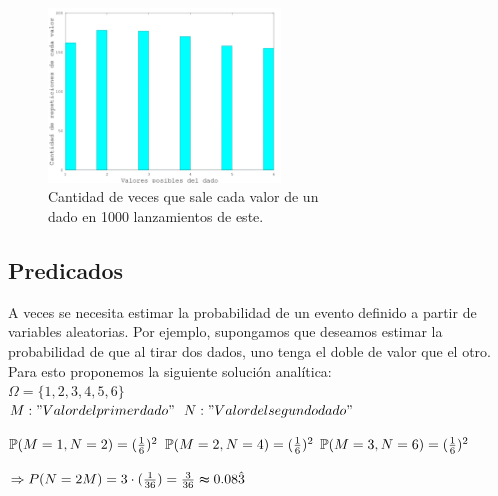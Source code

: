 \documentclass{article}
\begin{document}
\begin{figure}[h]
	\centering
	\includegraphics[width=0.55\textwidth]{images/probabilidadesDados.png}
	\caption{Cantidad de veces que sale cada valor de un\\ dado en 1000 lanzamientos de este.}
\end{figure}


\subsection{Predicados}

A veces se necesita estimar la probabilidad de un evento definido a partir de variables aleatorias. Por ejemplo, supongamos que deseamos estimar la probabilidad de que al tirar dos dados, uno tenga el doble de valor que el otro. Para esto proponemos la siguiente solución analítica:\\

\indent $\Omega = \{1,2,3,4,5,6\}$ \\

\indent $M: "Valor del primer dado"\\$
\indent $N: "Valor del segundo dado"\\$

\indent $\mathbb{P}(M=1, N=2) = ({1 \over 6})^2\\$
\indent $\mathbb{P}(M=2, N=4) = ({1 \over 6})^2\\$
\indent $\mathbb{P}(M=3, N=6) = ({1 \over 6})^2\\$

\indent $\Rightarrow {P}(N=2M) = 3\cdot({1 \over 36}) = {3 \over 36} \thickapprox 0.08\hat{3}\\$
\end{document}
